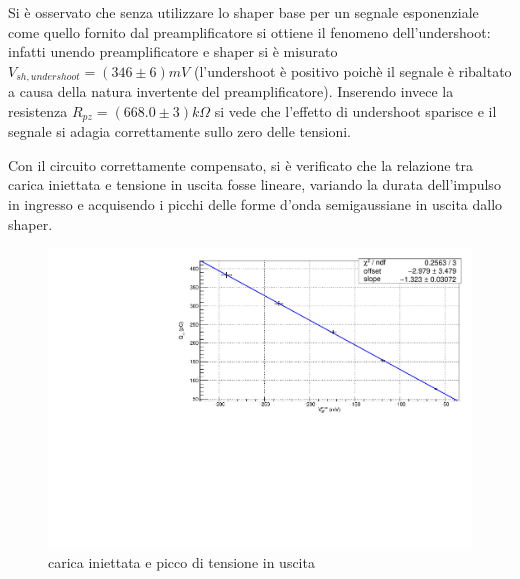 \documentclass{article}
\begin{document}
Si è osservato che senza utilizzare lo shaper base per un segnale esponenziale come quello fornito dal preamplificatore si ottiene il 
fenomeno dell'undershoot: infatti unendo preamplificatore e shaper si è misurato $V_{sh, undershoot}=(346 \pm 6)mV$ (l'undershoot è positivo poichè
il segnale è ribaltato a causa della natura invertente del preamplificatore). Inserendo invece la resistenza 
$R_{pz} = (668.0 \pm 3) k\Omega$ si vede che l'effetto di undershoot sparisce e il segnale si adagia correttamente sullo zero 
delle tensioni.

Con il circuito correttamente compensato, si è verificato che la relazione tra carica iniettata e tensione in uscita fosse
lineare, variando la durata dell'impulso in ingresso e acquisendo i picchi delle forme d'onda semigaussiane in uscita dallo shaper.

\begin{center}
    \begin{figure}[H]
    \centering
    \includegraphics[scale=0.375, angle=0]{fitshaper.pdf}
    \caption{carica iniettata e picco di tensione in uscita}
    \label{fig:fitshaper}
    \end{figure}
\end{center}
\end{document}
